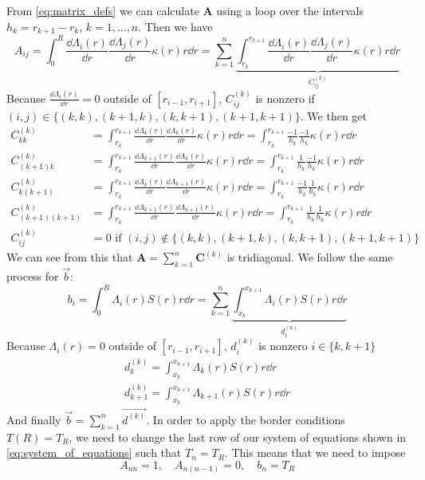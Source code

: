 From \autoref{eq:matrix_defs} we can calculate \(\mathbf{A}\) using a loop over the intervals \(h_k = r_{k+1} - r_k\), \(k = 1, \dots, n\). Then we have
\begin{equation}
    A_{ij}
    = \int_0^R \frac{\dd \Lambda_i(r)}{\dd r} \frac{\dd \Lambda_j(r)}{\dd r} \kappa(r) r \dd r
    = \sum_{k=1}^n \underbrace{\int_{r_k}^{r_{k+1}} \frac{\dd \Lambda_i(r)}{\dd r} \frac{\dd \Lambda_j(r)}{\dd r} \kappa(r) r \dd r}_{C_{ij}^{(k)}}
\end{equation}
Because \(\frac{\dd \Lambda_i(r)}{\dd r} = 0\) outside of \([r_{i-1}, r_{i+1}]\), \(C^{(k)}_{ij}\) is nonzero if \((i,j) \in \{(k,k), (k+1,k), (k,k+1), (k+1,k+1)\}\). We then get
\begin{align*}
    C^{(k)}_{kk} &= \int_{r_{k}}^{r_{k+1}} \frac{\dd \Lambda_{k}(r)}{\dd r} \frac{\dd \Lambda_{k}(r)}{\dd r} \kappa(r) r \dd r = \int_{r_{k}}^{r_{k+1}} \frac{-1}{h_k} \frac{-1}{h_k} \kappa(r) r \dd r \\
    C^{(k)}_{(k+1)k} &= \int_{r_{k}}^{r_{k+1}} \frac{\dd \Lambda_{k+1}(r)}{\dd r} \frac{\dd \Lambda_{k}(r)}{\dd r} \kappa(r) r \dd r = \int_{r_{k}}^{r_{k+1}} \frac{1}{h_k} \frac{-1}{h_k} \kappa(r) r \dd r \\
    C^{(k)}_{k(k+1)} &= \int_{r_{k}}^{r_{k+1}} \frac{\dd \Lambda_{k}(r)}{\dd r} \frac{\dd \Lambda_{k+1}(r)}{\dd r} \kappa(r) r \dd r = \int_{r_{k}}^{r_{k+1}} \frac{-1}{h_k} \frac{1}{h_k} \kappa(r) r \dd r \\
    C^{(k)}_{(k+1)(k+1)} &= \int_{r_{k}}^{r_{k+1}} \frac{\dd \Lambda_{k+1}(r)}{\dd r} \frac{\dd \Lambda_{k+1}(r)}{\dd r} \kappa(r) r \dd r = \int_{r_{k}}^{r_{k+1}} \frac{1}{h_k} \frac{1}{h_k} \kappa(r) r \dd r \\
    C^{(k)}_{ij} &= 0 \textrm{ if } (i,j) \notin \{(k,k), (k+1,k), (k,k+1), (k+1,k+1)\}
\end{align*}
We can see from this that \(\mathbf{A} = \sum_{k=1}^{n} \mathbf{C}^{(k)}\) is tridiagonal. We follow the same process for \(\vec{b}\):
\begin{equation}
    b_i = \int_0^R \Lambda_i(r) S(r) r \dd r = \sum_{k=1}^{n} \underbrace{\int_{x_k}^{x_{k+1}} \Lambda_i(r) S(r) r \dd r}_{d^{(k)}_i}
\end{equation}
Because \(\Lambda_i(r) = 0\) outside of \([r_{i-1}, r_{i+1}]\), \(d^{(k)}_i\) is nonzero \(i \in \{k, k+1\}\)
\begin{align*}
    d^{(k)}_k = \int_{x_k}^{x_{k+1}} \Lambda_k(r) S(r) r \dd r \\
    d^{(k)}_{k+1} = \int_{x_k}^{x_{k+1}} \Lambda_{k+1}(r) S(r) r \dd r
\end{align*}
And finally \(\vec{b} = \sum_{k=1}^{n} \overrightarrow{d^{(k)}}\). In order to apply the border conditions \(T(R) = T_R\), we need to change the last row of our system of equations shown in \autoref{eq:system_of_equations} such that \(T_n = T_R\). This means that we need to impose
\begin{equation}
    A_{nn} = 1, \quad A_{n(n-1)} = 0, \quad b_n = T_R
\end{equation}

